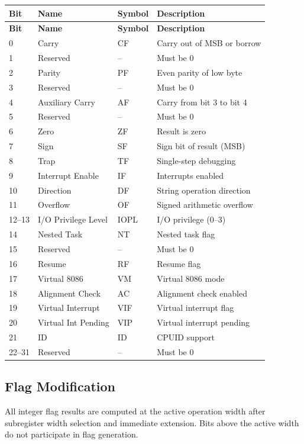 \documentclass[11pt]{article}
\begin{document}
\begin{longtable}{@{}llll@{}}
\toprule
\textbf{Bit} & \textbf{Name} & \textbf{Symbol} & \textbf{Description} \\ \midrule
\endfirsthead
\toprule
\textbf{Bit} & \textbf{Name} & \textbf{Symbol} & \textbf{Description} \\ \midrule
\endhead
0 & Carry & CF & Carry out of MSB or borrow \\
1 & Reserved & -- & Must be 0 \\
2 & Parity & PF & Even parity of low byte \\
3 & Reserved & -- & Must be 0 \\
4 & Auxiliary Carry & AF & Carry from bit 3 to bit 4 \\
5 & Reserved & -- & Must be 0 \\
6 & Zero & ZF & Result is zero \\
7 & Sign & SF & Sign bit of result (MSB) \\
8 & Trap & TF & Single-step debugging \\
9 & Interrupt Enable & IF & Interrupts enabled \\
10 & Direction & DF & String operation direction \\
11 & Overflow & OF & Signed arithmetic overflow \\
12--13 & I/O Privilege Level & IOPL & I/O privilege (0--3) \\
14 & Nested Task & NT & Nested task flag \\
15 & Reserved & -- & Must be 0 \\
16 & Resume & RF & Resume flag \\
17 & Virtual 8086 & VM & Virtual 8086 mode \\
18 & Alignment Check & AC & Alignment check enabled \\
19 & Virtual Interrupt & VIF & Virtual interrupt flag \\
20 & Virtual Int Pending & VIP & Virtual interrupt pending \\
21 & ID & ID & CPUID support \\
22--31 & Reserved & -- & Must be 0 \\ \bottomrule
\end{longtable}

\subsection{Flag Modification}

All integer flag results are computed at the active operation width after subregister width selection and immediate extension. Bits above the active width do not participate in flag generation.
\end{document}

